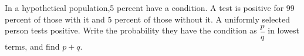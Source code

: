In a hypothetical population,5 percent have a condition. A test is positive for 99 percent of those with it and 5 percent of those without it. A uniformly selected person tests positive. Write the probability they have the condition as $\dfrac{p}{q}$ in lowest terms, and find $ p+q $.

